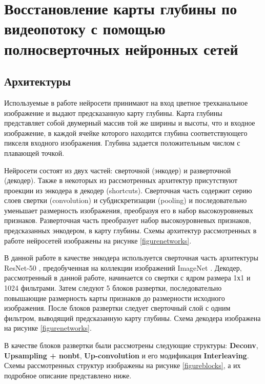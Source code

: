 \documentclass{mipt-thesis-bs}
\begin{document}

\chapter{Восстановление карты глубины по видеопотоку с помощью полносверточных нейронных сетей}

\section{Архитектуры}
\label{section_arch}

Используемые в работе нейросети принимают на вход цветное трехканальное изображение и выдают предсказанную карту глубины. Карта глубины представляет собой двумерный массив той же ширины и высоты, что и входное изображение, в каждой ячейке которого находится глубина соответствующего пикселя входного изображения. Глубина задается положительным числом с плавающей точкой.

Нейросети состоят из двух частей: сверточной (энкодер) и разверточной (декодер). Также в некоторых из рассмотренных архитектур присутствуют проекции из энкодера в декодер (shortcuts). Сверточная часть содержит серию слоев свертки (convolution) и субдискретизации (pooling) и  последовательно уменьшает размерность изображения, преобразуя его в набор высокоуровневых признаков. Разверточная часть преобразует набор высокоуровневых признаков, предсказанных энкодером, в карту глубины. Схемы архитектур рассмотренных в работе нейросетей изображены на рисунке \ref{figurenetworks}.

В данной работе в качестве энкодера используется сверточная часть архитектуры ResNet-50 \cite{he2016deep}, предобученная на коллекции изображений ImageNet \cite{deng2009imagenet}. Декодер, рассмотренный в данной работе, начинается со свертки с ядром размера 1х1 и 1024 фильтрами. Затем следуют 5 блоков развертки, последовательно повышающие размерность карты признаков до размерности исходного изображения. После блоков развертки следует сверточный слой с одним фильтром, выводящий предсказанную карту глубины. Схема декодера изображена на рисунке \ref{figurenetworks}.

В качестве блоков развертки были рассмотрены следующие структуры: \textbf{Deconv}, \textbf{Upsampling + nonbt}, \textbf{Up-convolution} и его модификация \textbf{Interleaving}. Схемы рассмотренных структур изображены на рисунке \ref{figureblocks}, а их подробное описание представлено ниже.
\end{document}
